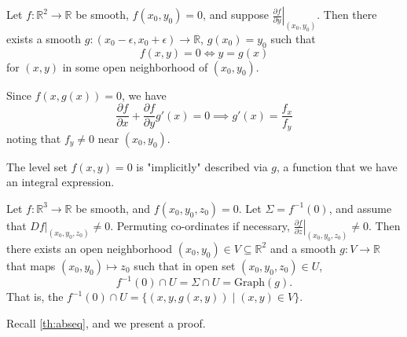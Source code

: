 \begin{example}
    Let \(f: \mathbb{R}^2 \to \mathbb{R}\) be smooth, \(f(x_0, y_0) = 0\), and suppose \(\left.\frac{\partial f}{\partial y}\right|_{(x_0, y_0)}\). Then there exists a smooth \(g: (x_0 - \epsilon, x_0 + \epsilon)\to \mathbb{R}\), \(g(x_0)=y_0\) such that
    \[
        f(x,y) = 0 \iff y = g(x)
    \]
    for \((x,y)\) in some open neighborhood of \((x_0, y_0)\).

    Since \(f(x, g(x)) = 0\), we have
    \[
        \frac{\partial f}{\partial x} + \frac{\partial f}{\partial y} g'(x) = 0 \implies g'(x) = \frac{f_x}{f_y}
    \]
    noting that \(f_y \neq 0\) near \((x_0, y_0)\).

    The level set \(f(x,y) = 0\) is "implicitly" described via \(g\), a function that we have an integral expression.
\end{example}
\begin{example}
    Let \(f: \mathbb{R}^3 \to \mathbb{R}\) be smooth, and \(f(x_0, y_0, z_0) = 0\). Let \(\Sigma = f^{-1}(0)\), and assume that \(\left. Df\right|_{(x_0, y_0,z_0)} \neq 0\). Permuting co-ordinates if necessary, \(\left.\frac{\partial f}{\partial z} \right|_{(x_0,y_0,z_0)} \neq 0\). Then there exists an open neighborhood \((x_0, y_0) \in V \subseteq \mathbb{R}^2\) and a smooth \(g: V \to \mathbb{R}\) that maps \((x_0, y_0) \mapsto z_0\) such that in open set \((x_0, y_0, z_0) \in U\),
    \[
        f^{-1}(0)\cap U = \Sigma\cap U = \mathrm{Graph}(g).
    \]
    That is, the \(f^{-1}(0)\cap U = \{(x,y,g(x,y))\mid (x,y)\in V\}\).
\end{example}
Recall \cref{th:abseq}, and we present a proof.
